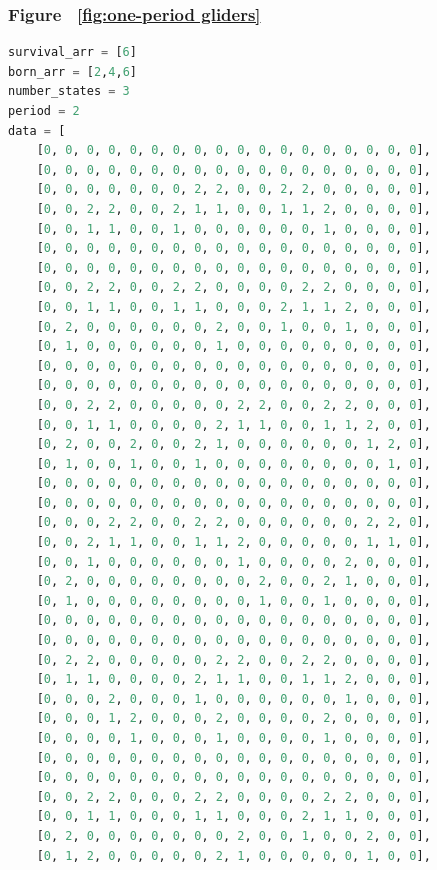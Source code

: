 \documentclass[12pt]{article}
\numberwithin{figure}{section} %
\begin{document}
\subsubsection{Figure ~\ref{fig:one-period gliders}}
\label{subsubsection:one-period gliders}
\begin{lstlisting}[language = Python]
survival_arr = [6]
born_arr = [2,4,6]
number_states = 3
period = 2
data = [
    [0, 0, 0, 0, 0, 0, 0, 0, 0, 0, 0, 0, 0, 0, 0, 0, 0, 0],
    [0, 0, 0, 0, 0, 0, 0, 0, 0, 0, 0, 0, 0, 0, 0, 0, 0, 0],
    [0, 0, 0, 0, 0, 0, 0, 2, 2, 0, 0, 2, 2, 0, 0, 0, 0, 0],
    [0, 0, 2, 2, 0, 0, 2, 1, 1, 0, 0, 1, 1, 2, 0, 0, 0, 0],
    [0, 0, 1, 1, 0, 0, 1, 0, 0, 0, 0, 0, 0, 1, 0, 0, 0, 0],
    [0, 0, 0, 0, 0, 0, 0, 0, 0, 0, 0, 0, 0, 0, 0, 0, 0, 0],
    [0, 0, 0, 0, 0, 0, 0, 0, 0, 0, 0, 0, 0, 0, 0, 0, 0, 0],
    [0, 0, 2, 2, 0, 0, 2, 2, 0, 0, 0, 0, 2, 2, 0, 0, 0, 0],
    [0, 0, 1, 1, 0, 0, 1, 1, 0, 0, 0, 2, 1, 1, 2, 0, 0, 0],
    [0, 2, 0, 0, 0, 0, 0, 0, 2, 0, 0, 1, 0, 0, 1, 0, 0, 0],
    [0, 1, 0, 0, 0, 0, 0, 0, 1, 0, 0, 0, 0, 0, 0, 0, 0, 0],
    [0, 0, 0, 0, 0, 0, 0, 0, 0, 0, 0, 0, 0, 0, 0, 0, 0, 0],
    [0, 0, 0, 0, 0, 0, 0, 0, 0, 0, 0, 0, 0, 0, 0, 0, 0, 0],
    [0, 0, 2, 2, 0, 0, 0, 0, 0, 2, 2, 0, 0, 2, 2, 0, 0, 0],
    [0, 0, 1, 1, 0, 0, 0, 0, 2, 1, 1, 0, 0, 1, 1, 2, 0, 0],
    [0, 2, 0, 0, 2, 0, 0, 2, 1, 0, 0, 0, 0, 0, 0, 1, 2, 0],
    [0, 1, 0, 0, 1, 0, 0, 1, 0, 0, 0, 0, 0, 0, 0, 0, 1, 0],
    [0, 0, 0, 0, 0, 0, 0, 0, 0, 0, 0, 0, 0, 0, 0, 0, 0, 0],
    [0, 0, 0, 0, 0, 0, 0, 0, 0, 0, 0, 0, 0, 0, 0, 0, 0, 0],
    [0, 0, 0, 2, 2, 0, 0, 2, 2, 0, 0, 0, 0, 0, 0, 2, 2, 0],
    [0, 0, 2, 1, 1, 0, 0, 1, 1, 2, 0, 0, 0, 0, 0, 1, 1, 0],
    [0, 0, 1, 0, 0, 0, 0, 0, 0, 1, 0, 0, 0, 0, 2, 0, 0, 0],
    [0, 2, 0, 0, 0, 0, 0, 0, 0, 0, 2, 0, 0, 2, 1, 0, 0, 0],
    [0, 1, 0, 0, 0, 0, 0, 0, 0, 0, 1, 0, 0, 1, 0, 0, 0, 0],
    [0, 0, 0, 0, 0, 0, 0, 0, 0, 0, 0, 0, 0, 0, 0, 0, 0, 0],
    [0, 0, 0, 0, 0, 0, 0, 0, 0, 0, 0, 0, 0, 0, 0, 0, 0, 0],    
    [0, 2, 2, 0, 0, 0, 0, 0, 2, 2, 0, 0, 2, 2, 0, 0, 0, 0],
    [0, 1, 1, 0, 0, 0, 0, 2, 1, 1, 0, 0, 1, 1, 2, 0, 0, 0],
    [0, 0, 0, 2, 0, 0, 0, 1, 0, 0, 0, 0, 0, 0, 1, 0, 0, 0],
    [0, 0, 0, 1, 2, 0, 0, 0, 2, 0, 0, 0, 0, 2, 0, 0, 0, 0],
    [0, 0, 0, 0, 1, 0, 0, 0, 1, 0, 0, 0, 0, 1, 0, 0, 0, 0],
    [0, 0, 0, 0, 0, 0, 0, 0, 0, 0, 0, 0, 0, 0, 0, 0, 0, 0],
    [0, 0, 0, 0, 0, 0, 0, 0, 0, 0, 0, 0, 0, 0, 0, 0, 0, 0],  
    [0, 0, 2, 2, 0, 0, 0, 2, 2, 0, 0, 0, 0, 2, 2, 0, 0, 0],
    [0, 0, 1, 1, 0, 0, 0, 1, 1, 0, 0, 0, 2, 1, 1, 0, 0, 0],
    [0, 2, 0, 0, 0, 0, 0, 0, 0, 2, 0, 0, 1, 0, 0, 2, 0, 0],
    [0, 1, 2, 0, 0, 0, 0, 0, 2, 1, 0, 0, 0, 0, 0, 1, 0, 0],

\end{lstlisting}
\end{document}
